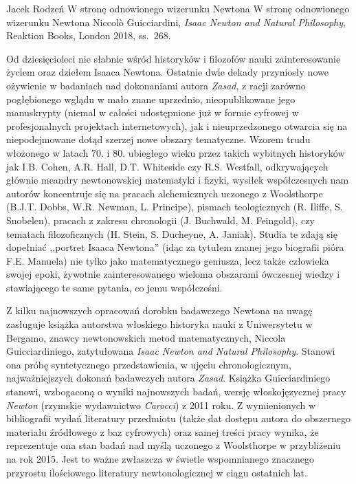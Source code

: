 \begin{recplenv}{Jacek Rodzeń}
	{W stronę odnowionego wizerunku Newtona}
	{W stronę odnowionego wizerunku Newtona}
	{Niccolò Guicciardini, \textit{Isaac Newton and Natural Philosophy}, Reaktion Books, London 2018, ss.~268.}
		




Od dziesięcioleci nie słabnie wśród historyków i filozofów nauki zainteresowanie życiem oraz dziełem Isaaca Newtona.
Ostatnie dwie dekady przyniosły nowe ożywienie w badaniach nad dokonaniami autora \textit{Zasad}, z racji zarówno
pogłębionego wglądu w mało znane uprzednio, nieopublikowane jego manuskrypty (niemal w całości udostępnione już w
formie cyfrowej w profesjonalnych projektach internetowych), jak i nieuprzedzonego otwarcia się na niepodejmowane dotąd
szerzej nowe obszary tematyczne. Wzorem trudu włożonego w latach 70. i 80. ubiegłego wieku przez takich wybitnych
historyków jak I.B. Cohen, A.R. Hall, D.T. Whiteside czy R.S. Westfall, odkrywających głównie meandry newtonowskiej
matematyki i fizyki, wysiłek współczesnych nam autorów koncentruje się na pracach alchemicznych uczonego z Woolsthorpe
(B.J.T. Dobbs, W.R. Newman, L. Principe), pismach teologicznych (R. Iliffe, S. Snobelen), pracach z zakresu chronologii
(J. Buchwald, M. Feingold), czy tematach filozoficznych (H. Stein, S. Ducheyne, A. Janiak). Studia te zdają się
dopełniać ,,portret Isaaca Newtona'' (idąc za tytułem znanej jego biografii pióra F.E. Manuela) nie tylko jako
matematycznego geniusza, lecz także człowieka swojej epoki, żywotnie zainteresowanego wieloma obszarami ówczesnej
wiedzy i stawiającego te same pytania, co jemu współcześni.

Z kilku najnowszych opracowań dorobku badawczego Newtona na uwagę zasługuje książka autorstwa włoskiego historyka
nauki z Uniwersytetu w Bergamo, znawcy newtonowskich metod matematycznych, Niccola Guicciardiniego, zatytułowana
\textit{Isaac Newton and Natural Philosophy}. Stanowi ona próbę syntetycznego przedstawienia, w ujęciu chronologicznym,
najważniejszych dokonań badawczych autora \textit{Zasad}. Książka Guicciardiniego stanowi, wzbogaconą o wyniki
najnowszych badań, wersję włoskojęzycznej pracy \textit{Newton} (rzymskie wydawnictwo \textit{Carocci}) z 2011 roku. Z
wymienionych w bibliografii wydań literatury przedmiotu (także dat dostępu autora do obszernego materiału źródłowego z
baz cyfrowych) oraz samej treści pracy wynika, że reprezentuje ona stan badań nad myślą uczonego z Woolsthorpe w
przybliżeniu na rok 2015. Jest to ważne zwłaszcza w świetle wspomnianego znacznego przyrostu ilościowego literatury
newtonologicznej w ciągu ostatnich lat. 


\end{recplenv}
